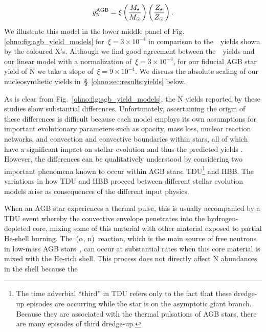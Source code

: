 \begin{equation}
y_\text{N}^\text{AGB} = \xi \left(\frac{M_\star}{M_\odot}\right)
\left(\frac{Z_\star}{Z_\odot}\right).
\label{ohno:eq:linear_yield}
\end{equation}
We illustrate this model in the lower middle panel of Fig.
\ref{ohno:fig:agb_yield_models} for~$\xi = 3\times10^{-4}$ in comparison to
the~\cristallo~yields shown by the coloured X's.
Although we find good agreement between the~\cristallo~yields and our linear
model with a normalization of~$\xi = 3\times10^{-4}$, for our fiducial AGB star
yield of N we take a slope of~$\xi = 9\times10^{-4}$.
We discuss the absolute scaling of our nucleosynthetic yields
in~\S~\ref{ohno:sec:results:yields} below.
\par
As is clear from Fig.~\ref{ohno:fig:agb_yield_models}, the N yields reported by
these studies show substantial differences.
Unfortunately, ascertaining the origin of these differences is difficult
because each model employs its own assumptions for important evolutionary
parameters such as opacity, mass loss, nuclear reaction networks, and
convection and convective boundaries within stars, all of which have a
significant impact on stellar evolution and thus the predicted yields
\citep{Karakas2014, Karakas2016, Ventura2016, Ventura2018}.
However, the differences can be qualitatively understood by considering two
important phenomena known to occur within AGB stars: TDU\footnote{
	The time adverbial ``third'' in TDU refers only to the fact that these
	dredge-up episodes are occurring while the star is on the asymptotic giant
	branch. Because they are associated with the thermal pulsations of AGB
	stars, there are many episodes of third dredge-up.
} and HBB.
The variations in how TDU and HBB proceed between different stellar evolution
models arise as consequences of the different input physics.
\par
When an AGB star experiences a thermal pulse,
this is usually accompanied
by a TDU event whereby the convective envelope penetrates into the
hydrogen-depleted core, mixing some of this material with other material
exposed to partial He-shell burning.
The~\Cthirteen($\alpha$, n)\Osixteen~reaction, which is the main source of free
neutrons in low-mass AGB stars~\citep{Gallino1998}, can occur at substantial
rates when this core material is mixed with the He-rich shell.
This process does not directly affect N abundances in the shell because the
